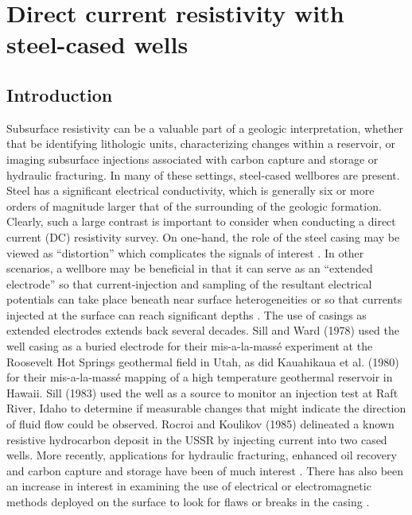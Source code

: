 
\chapter{Direct current resistivity with steel-cased wells}
\label{ch:casing_dc}

\section{Introduction}
Subsurface resistivity can be a valuable part of a geologic interpretation, whether that be identifying lithologic units, characterizing changes within a reservoir, or imaging subsurface injections associated with carbon capture and storage or hydraulic fracturing. In many of these settings, steel-cased wellbores are present. Steel has a significant electrical conductivity, which is generally six or more orders of magnitude larger that of the surrounding of the geologic formation. Clearly, such a large contrast is important to consider when conducting a direct current (DC) resistivity survey. On one-hand, the role of the steel casing may be viewed as ``distortion'' which complicates the signals of interest \citep{Wait1983, Holladay1984, Johnston1987}. In other scenarios, a wellbore may be beneficial in that it can serve as an ``extended electrode'' so that current-injection and sampling of the resultant electrical potentials can take place beneath near surface heterogeneities \citep{Ramirez1996, Rucker2010, Rucker2012, Ronczka2015} or so that currents injected at the surface can reach significant depths \citep{Schenkel1994, Weiss2016, hoversten2017borehole}. The use of casings as extended electrodes extends back several decades. Sill and Ward (1978) used the well casing as a buried electrode for their mis-a-la-mass\'e experiment at the Roosevelt Hot Springs geothermal field in Utah, as did Kauahikaua et al. (1980) for their mis-a-la-mass\'e mapping of a high temperature geothermal reservoir in Hawaii. Sill (1983) used the well as a source to monitor an injection test at Raft River, Idaho to determine if measurable changes that might indicate the direction of fluid flow could be observed. Rocroi and Koulikov (1985) delineated a known resistive hydrocarbon deposit in the USSR by injecting current into two cased wells. More recently, applications for hydraulic fracturing, enhanced oil recovery and carbon capture and storage have been of much interest \citep{Commer2015, Um2015, Weiss2016, hoversten2017borehole}. There has also been an increase in interest in examining the use of electrical or electromagnetic methods deployed on the surface to look for flaws or breaks in the casing \citep{Wilt2018}.

